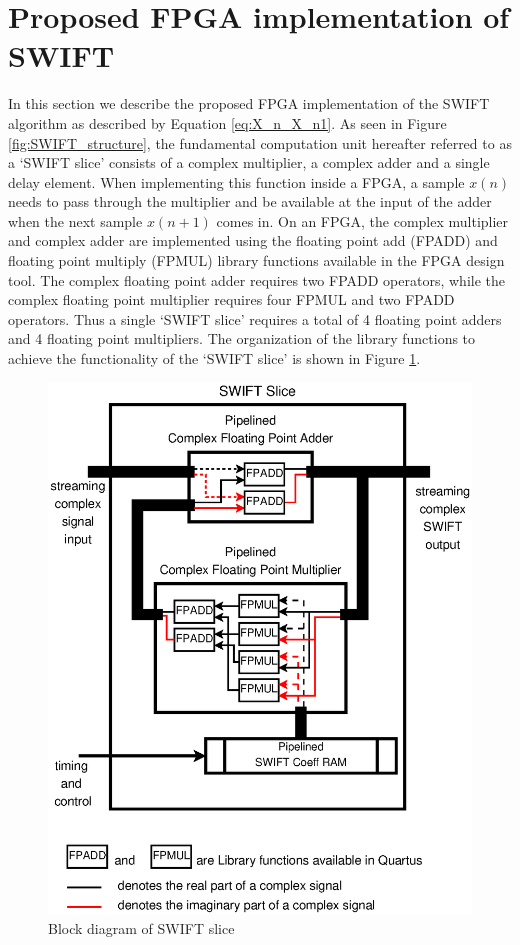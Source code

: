 \section{Proposed FPGA implementation of SWIFT}
\label{Sec:FPGA}

In this section we describe the proposed FPGA implementation of the SWIFT algorithm as described by Equation \ref{eq:X_n_X_n1}. As seen in Figure \ref{fig:SWIFT_structure}, the fundamental computation unit hereafter referred to as a `SWIFT slice' consists of a complex multiplier, a complex adder and a single delay element. When implementing this function inside a FPGA, a sample $x(n)$  needs to pass through the multiplier and be available at the input of the adder when the next sample $x(n+1)$ comes in. On an FPGA, the complex multiplier and complex adder are implemented using the floating point add (FPADD) and floating point multiply (FPMUL) library functions available in the FPGA design tool. The complex floating point adder requires two FPADD operators, while the complex floating point multiplier requires four FPMUL and two FPADD operators. Thus a single `SWIFT slice' requires a total of 4 floating point adders and 4 floating point multipliers. The organization of the library functions to achieve the functionality of the `SWIFT slice' is shown in Figure \ref{fig:SWIFT_unit}.

\begin{figure}[tbp]
\centering
\includegraphics[width=0.85\columnwidth]{Figures/fig_SWIFT_slice.eps}
\caption{Block diagram of SWIFT slice}
\label{fig:SWIFT_unit}
\end{figure}

